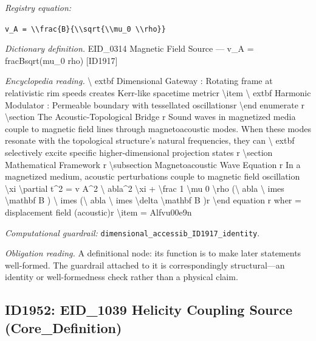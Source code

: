 \documentclass[11pt]{article}
\theoremstyle{remark}
\begin{document}
\noindent\textit{Registry equation:}\par
{\small\texttt{v\_A = \textbackslash{}\textbackslash{}frac\{B\}\{\textbackslash{}\textbackslash{}sqrt\{\textbackslash{}\textbackslash{}mu\_0 \textbackslash{}\textbackslash{}rho\}\}}}\par\medskip
\noindent\textit{Dictionary definition.} EID\_0314 Magnetic Field Source --- v\_A = fracBsqrt(mu\_0 rho) [ID1917]\par\medskip
\noindent\textit{Encyclopedia reading.} \textbackslash{} extbf Dimensional Gateway : Rotating frame at relativistic rim speeds creates Kerr-like spacetime metricr \textbackslash{}item \textbackslash{} extbf Harmonic Modulator : Permeable boundary with tessellated oscillationsr \textbackslash{}end enumerate r \textbackslash{}section The Acoustic-Topological Bridge r Sound waves in magnetized media couple to magnetic field lines through magnetoacoustic modes. When these modes resonate with the topological structure's natural frequencies, they can \textbackslash{} extbf selectively excite specific higher-dimensional projection states r \textbackslash{}section Mathematical Framework r \textbackslash{}subsection Magnetoacoustic Wave Equation r In a magnetized medium, acoustic perturbations couple to magnetic field oscillation \textbackslash{}xi \textbackslash{}partial t\textasciicircum{}2 = v A\textasciicircum{}2 \textbackslash{} abla\textasciicircum{}2 \textbackslash{}xi + \textbackslash{}frac 1 \textbackslash{}mu 0 \textbackslash{}rho (\textbackslash{} abla \textbackslash{} imes \textbackslash{}mathbf B ) \textbackslash{} imes (\textbackslash{} abla \textbackslash{} imes \textbackslash{}delta \textbackslash{}mathbf B )r \textbackslash{}end equation r wher = displacement field (acoustic)r \textbackslash{}item = Alfvu00e9n
\par\medskip\noindent\textit{Computational guardrail:} \texttt{dimensional\_accessib\_ID1917\_identity}.
\par\medskip\noindent\textit{Obligation reading.} A definitional node: its function is to make later statements well-formed. The guardrail attached to it is correspondingly structural---an identity or well-formedness check rather than a physical claim.

\subsection{ID1952: EID\_1039 Helicity Coupling Source (Core\_Definition)}
\end{document}

